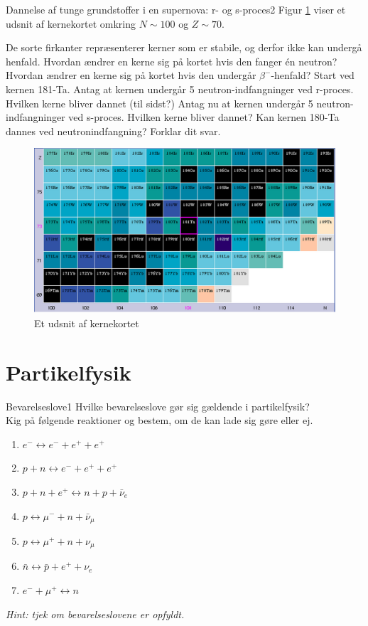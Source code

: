 \begin{opgave}{Dannelse af tunge grundstoffer i en supernova: r- og s-proces}{2}
Figur \ref{fig:sn} viser et udsnit af kernekortet omkring $N \sim 100$ og $Z \sim 70$. 


De sorte firkanter repræsenterer kerner som er stabile, og derfor ikke kan undergå henfald. 
\opg Hvordan ændrer en kerne sig på kortet hvis den fanger én neutron? Hvordan ændrer en kerne sig på kortet hvis den undergår $\beta^-$-henfald?
\opg Start ved kernen 181-Ta. Antag at kernen undergår 5 neutron-indfangninger ved r-proces. Hvilken kerne bliver dannet (til sidst?)
\opg Antag nu at kernen undergår 5 neutron-indfangninger ved s-proces. Hvilken kerne bliver dannet?
\opg Kan kernen 180-Ta dannes ved neutronindfangning? Forklar dit svar.
\end{opgave}
\begin{figure}[h]
	\centering
	\includegraphics[width=\textwidth]{KernePartikel/supernova_chart.png}
	\caption{Et udsnit af kernekortet}
	\label{fig:sn}
\end{figure}
\newpage

\section*{Partikelfysik}

\begin{opgave}{Bevarelseslove}{1}
\opg Hvilke bevarelseslove gør sig gældende i partikelfysik?\\
\opg Kig på følgende reaktioner og bestem, om de kan lade sig gøre eller ej.
\begin{enumerate}
\item $e^- \longleftrightarrow e^- + e^+ + e^+$
\item $p + n \longleftrightarrow e^- + e^+ + e^+$
\item $p + n + e^+ \longleftrightarrow n + p + \bar{\nu}_e$
\item $p \longleftrightarrow \mu^- + n + \bar{\nu}_\mu $
\item $p \longleftrightarrow \mu^+ + n + \nu_\mu $
\item $\bar{n} \longleftrightarrow \bar{p} + e^+ + \nu_e$
\item $e^- + \mu^+ \longleftrightarrow n$
\end{enumerate}
\emph{Hint: tjek om bevarelseslovene er opfyldt.}
\end{opgave}

